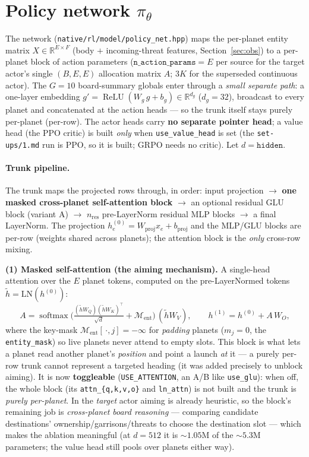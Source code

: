 \documentclass[11pt]{article}
\newcommand{\R}{\mathbb{R}}
\newcommand{\softmax}{\operatorname{softmax}}
\newcommand{\relu}{\operatorname{ReLU}}
\begin{document}
\section{Policy network $\pi_\theta$}\label{sec:policy}
The network (\texttt{native/rl/model/policy\_net.hpp}) maps the per-planet entity matrix
$X\in\R^{E\times F}$ (body $+$ incoming-threat features, Section~\ref{sec:obs}) to a per-planet
block of action parameters ($\texttt{n\_action\_params}=E$ per source for the target actor's single
$(B,E,E)$ allocation matrix $A$; $3K$ for the superseded continuous actor). The $G=10$ board-summary
globals enter through a
\emph{small separate path}: a one-layer embedding $g'=\relu(W_g\,g+b_g)\in\R^{d_g}$ ($d_g=32$),
broadcast to every planet and concatenated at the action heads --- so the trunk itself stays purely
per-planet (per-row). The actor heads carry \textbf{no separate pointer head}; a value head (the PPO
critic) is built \emph{only} when \texttt{use\_value\_head} is set (the \texttt{set-ups/1.md} run is
PPO, so it is built; GRPO needs no critic). Let $d=\texttt{hidden}$.

\paragraph{Trunk pipeline.} The trunk maps the projected rows through, in order: input projection
$\to$ \textbf{one masked cross-planet self-attention block} $\to$ an optional residual GLU block
(variant A) $\to$ $n_{\mathrm{res}}$ pre-LayerNorm residual MLP blocks $\to$ a final LayerNorm. The
projection $h^{(0)}_e=W_{\mathrm{proj}}x_e+b_{\mathrm{proj}}$ and the MLP/GLU blocks are per-row
(weights shared across planets); the attention block is the \emph{only} cross-row mixing.

\smallskip\noindent\textbf{(1) Masked self-attention (the aiming mechanism).} A single-head attention
over the $E$ planet tokens, computed on the pre-LayerNormed tokens $\tilde h=\mathrm{LN}(h^{(0)})$:
\begin{equation}
A = \softmax\!\Big(\tfrac{(\tilde h W_Q)(\tilde h W_K)^{\!\top}}{\sqrt d}
      + \mathcal{M}_{\mathrm{ent}}\Big)\,(\tilde h W_V),\qquad
h^{(1)} = h^{(0)} + A\,W_O,
\end{equation}
where the key-mask $\mathcal{M}_{\mathrm{ent}}[\,\cdot,j]=-\infty$ for \emph{padding} planets
($m_j=0$, the \texttt{entity\_mask}) so live planets never attend to empty slots. This block is what
lets a planet read another planet's \emph{position} and point a launch \emph{at} it --- a purely
per-row trunk cannot represent a targeted heading (it was added precisely to unblock aiming). It is now
\textbf{toggleable} (\texttt{USE\_ATTENTION}, an A/B like \texttt{use\_glu}): when off, the whole block
(its \texttt{attn\_\{q,k,v,o\}} and \texttt{ln\_attn}) is not built and the trunk is \emph{purely
per-planet}. In the \emph{target} actor aiming is already heuristic, so the block's remaining job is
\emph{cross-planet board reasoning} --- comparing candidate destinations' ownership/garrisons/threats to
choose the destination slot --- which makes the ablation meaningful (at $d{=}512$ it is ${\sim}1.05$M of
the ${\sim}5.3$M parameters; the value head still pools over planets either way).
\end{document}
